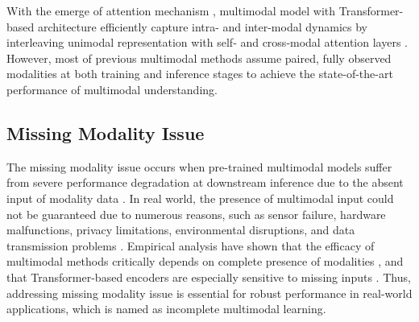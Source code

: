 \documentclass{article}
\begin{document}
With the emerge of attention mechanism \cite{vaswani2017attention}, multimodal model with Transformer-based architecture efficiently capture intra- and inter-modal dynamics by interleaving unimodal representation with self‐ and cross‐modal attention layers \cite{wang2023large,xu2023multimodal}. However, most of previous multimodal methods assume paired, fully observed modalities at both training and inference stages to achieve the state-of-the-art performance of multimodal understanding.

\subsection{Missing Modality Issue}
The missing modality issue occurs when pre-trained multimodal models suffer from severe performance degradation at downstream inference due to the absent input of modality data \cite{lin2023missmodal,huan2024unimf}. In real world, the presence of multimodal input could not be guaranteed due to numerous reasons, such as sensor failure, hardware malfunctions, privacy limitations, environmental disruptions, and data transmission problems
\cite{wu2024deep}. Empirical analysis have shown that the efficacy of multimodal methods critically depends on complete presence of modalities \cite{hazarika2022analyzing}, and that Transformer-based encoders are especially sensitive to missing inputs \cite{ma2022multimodal}. Thus, addressing missing modality issue is essential for robust performance in real-world applications, which is named as incomplete multimodal learning.
\end{document}
